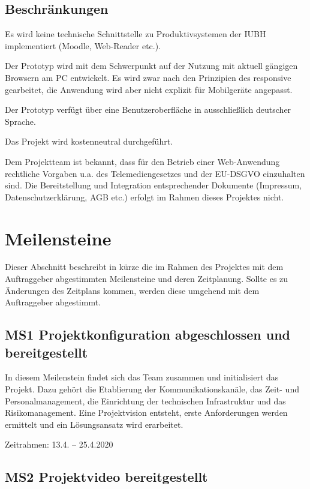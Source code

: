 \documentclass[a4paper,11pt,listof=numbered,glossary=totoc,parskip=half,toc=bib]{scrreprt}
\begin{document}
{\subsection{Beschränkungen}
Es wird keine technische Schnittstelle zu Produktivsystemen der IUBH implementiert (Moodle, Web-Reader etc.).

Der Prototyp wird mit dem Schwerpunkt auf der Nutzung mit aktuell gängigen Browsern am PC entwickelt. Es wird zwar nach den Prinzipien des \Gls{responsive} gearbeitet, die Anwendung wird aber nicht explizit für Mobilgeräte angepasst.

Der Prototyp verfügt über eine Benutzeroberfläche in ausschließlich deutscher Sprache.

Das Projekt wird kostenneutral durchgeführt.

Dem Projektteam ist bekannt, dass für den Betrieb einer Web-Anwendung rechtliche Vorgaben u.a. des Telemediengesetzes und der EU-DSGVO einzuhalten sind. Die Bereitstellung und Integration entsprechender Dokumente (Impressum, Datenschutzerklärung, AGB etc.) erfolgt im Rahmen dieses Projektes nicht.	
	
	\newpage
	\section{Meilensteine}
Dieser Abschnitt beschreibt in kürze die im Rahmen des Projektes mit dem Auftraggeber abgestimmten Meilensteine und deren Zeitplanung.
Sollte es zu Änderungen des Zeitplans kommen, werden diese umgehend mit dem Auftraggeber abgestimmt.

\subsection{MS1 Projektkonfiguration abgeschlossen und bereitgestellt}

In diesem Meilenstein findet sich das Team zusammen und initialisiert das Projekt. 
Dazu gehört die Etablierung der Kommunikationskanäle, das Zeit- und Personalmanagement, die Einrichtung der technischen Infrastruktur und das Risikomanagement.
Eine Projektvision entsteht, erste Anforderungen werden ermittelt und ein Lösungsansatz wird erarbeitet.

Zeitrahmen: 13.4. -- 25.4.2020


\subsection{MS2 Projektvideo bereitgestellt}

}
\end{document}
